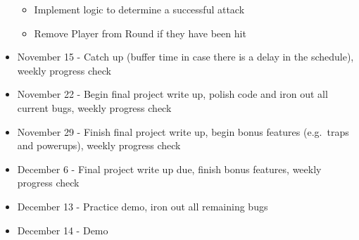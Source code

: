 \documentclass{article}
\begin{document}
\begin{itemize}
\begin{itemize}
      \item Implement logic to determine a successful attack
      \item Remove Player from Round if they have been hit
    \end{itemize}
  \item November 15 - Catch up (buffer time in case there is a delay 
    in the schedule), weekly progress check
  \item November 22 - Begin final project write up, polish code and iron out all current bugs, 
    weekly progress check
  \item November 29 - Finish final project write up, begin bonus features (e.g.\ traps and powerups),
    weekly progress check
  \item December 6 - Final project write up due, finish bonus features, weekly progress check
  \item December 13 - Practice demo, iron out all remaining bugs
  \item December 14 - Demo
\end{itemize}
\end{document}
